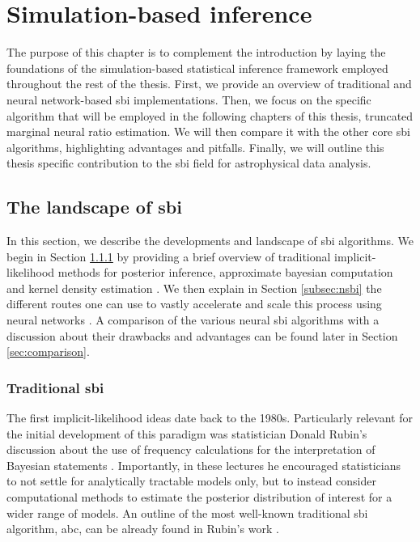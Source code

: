 \chapter{Simulation-based inference} \label{cha:sbi}
	
The purpose of this chapter is to complement the introduction by laying the foundations of the simulation-based statistical inference framework employed throughout the rest of the thesis. First, we provide an overview of traditional and neural network-based \gls*{sbi} implementations. Then, we focus on the specific algorithm that will be employed in the following chapters of this thesis, truncated marginal neural ratio estimation. We will then compare it with the other core \gls*{sbi} algorithms, highlighting advantages and pitfalls. Finally, we will outline this thesis specific contribution to the \gls*{sbi} field for astrophysical data analysis.


\section{The landscape of \gls*{sbi}} \label{sec:sbi}

In this section, we describe the developments and landscape of \gls*{sbi} algorithms. We begin in Section \ref{subsec:abc} by providing a brief overview of traditional implicit-likelihood methods for posterior inference, approximate bayesian computation \cite{Sisson:2018aa} and kernel density estimation \cite{diggle1984monte}. We then explain in Section \ref{subsec:nsbi} the different routes one can use to vastly accelerate and scale this process using neural networks \cite{Cranmer:2019eaq, Lueckmann:2021aa}. A comparison of the various neural \gls*{sbi} algorithms with a discussion about their drawbacks and advantages can be found later in Section \ref{sec:comparison}. 



\subsection{Traditional \gls*{sbi}}  \label{subsec:abc}

The first implicit-likelihood ideas date back to the 1980s. Particularly relevant for the initial development of this paradigm was statistician Donald Rubin's discussion about the use of frequency calculations for the interpretation of Bayesian statements \cite{rubin1984bayesianly}. Importantly, in these lectures he encouraged statisticians to not settle for analytically tractable models only, but to instead consider computational methods to estimate the posterior distribution of interest for a wider range of models. An outline of the most well-known traditional \gls*{sbi} algorithm, \gls*{abc}, can be already found in Rubin's work \cite[Section 3.1]{rubin1984bayesianly}. 


